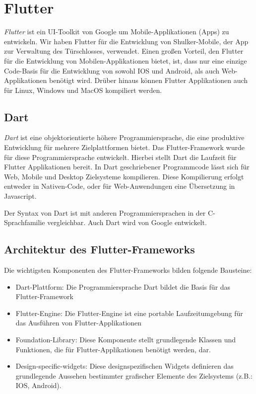\color{BlueViolet}
\section{Flutter}
\label{flutter}
\textit{Flutter} ist ein UI-Toolkit von Google um Mobile-Applikationen (Apps) zu entwickeln.
Wir haben Flutter für die Entwicklung von Shulker-Mobile, der App zur Verwaltung des Türschlosses, verwendet.
Einen großen Vorteil, den Flutter für die Entwicklung von Mobilen-Applikationen bietet, ist, 
dass nur eine einzige Code-Basis für die Entwicklung von sowohl IOS und Android, als auch Web-Applikationen benötigt wird.
Drüber hinaus können Flutter Applikationen auch für Linux, Windows und MacOS kompiliert werden. 
\cite{flutterwikipediaEN}

\subsection{Dart}
\textit{Dart} ist eine objektorientierte höhere Programmiersprache, die eine produktive Entwicklung für
mehrere Zielplattformen bietet. Das Flutter-Framework wurde für diese Programmiersprache entwickelt.
Hierbei stellt Dart die Laufzeit für Flutter Applikationen bereit.
In Dart geschriebener Programmcode lässt sich für Web, Mobile und Desktop Zielsysteme kompilieren. 
Diese Kompilierung erfolgt entweder in Nativen-Code, oder für Web-Anwendungen eine Übersetzung in Javascript.

Der Syntax von Dart ist mit anderen Programmiersprachen in der C-Sprachfamilie vergleichbar.
Auch Dart wird von Google entwickelt.
\cite{dartwikipedia}

\subsection{Architektur des Flutter-Frameworks}
Die wichtigsten Komponenten des Flutter-Frameworks bilden folgende Bausteine: \cite{flutterwikipediaEN}
\begin{itemize}
    \item Dart-Plattform: Die Programmiersprache Dart bildet die Basis für das Flutter-Framework
    \item Flutter-Engine: Die Flutter-Engine ist eine portable Laufzeitumgebung für das Ausführen von Flutter-Applikationen
    \item Foundation-Library: Diese Komponente stellt grundlegende Klassen und Funktionen, die für 
    Flutter-Applikationen benötigt werden, dar.
    \item Design-specific-widgets: Diese designspezifischen Widgets definieren das grundlegende Aussehen
    bestimmter grafischer Elemente des Zielsystems (z.B.: IOS, Android).
\end{itemize}

